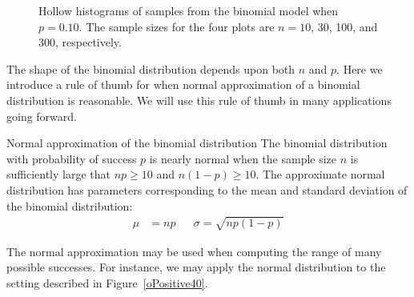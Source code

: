 \begin{figure}[h]
\centering
{}
\caption{Hollow histograms of samples from the binomial model when $p=0.10$. The sample sizes for the four plots are $n=10$, 30, 100, and 300, respectively.}
\label{fourBinomialModelsShowingApproxToNormal}
\end{figure}

The shape of the binomial distribution depends upon both $n$ and $p$.     Here we introduce a rule of thumb for when normal approximation of a binomial distribution is reasonable.  We will use this rule of thumb in many applications going forward.  

\begin{onebox}{Normal approximation of the binomial distribution}
The binomial distribution with probability of success $p$ is nearly normal when the sample size $n$ is sufficiently large that $np\ge 10$ and $n(1-p)\ge 10$. The approximate normal distribution has parameters corresponding to the mean and standard deviation of the binomial distribution:\vspace{-1.5mm}
\begin{align*}
\mu &= np
&&\sigma= \sqrt{np(1-p)}
\end{align*}\end{onebox}

\D{\newpage}

The normal approximation may be used when computing the range of many possible successes. For instance, we may apply the normal distribution to the setting described in Figure~\ref{oPositive40}.


